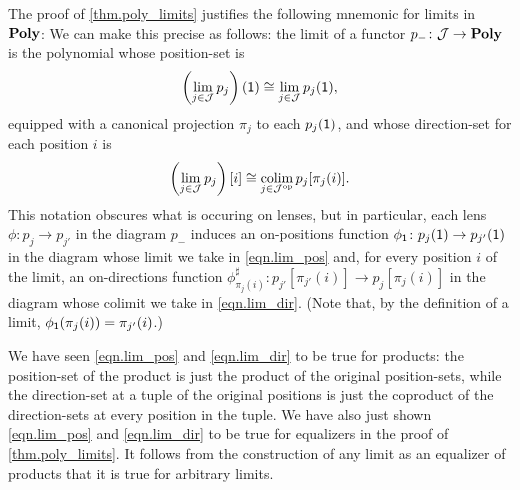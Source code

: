 \documentclass[Book-Poly]{subfiles}
\begin{document}
\begin{example}
The proof of \cref{thm.poly_limits} justifies the following mnemonic for limits in $\mathbf{Poly}$:
We can make this precise as follows: the limit of a functor $p_-\colon\mathcal{J}\to\mathbf{Poly}$ is the polynomial whose position-set is
\begin{equation} \label{eqn.lim_pos}
    \left(\lim_{j\in\mathcal{J}} p_j\right)(\textsf{1}) \cong \lim_{j\in\mathcal{J}} p_j(\textsf{1}),
\end{equation}
equipped with a canonical projection $\pi_j$ to each $p_j(\textsf{1})$, and whose direction-set for each position $i$ is
\begin{equation} \label{eqn.lim_dir}
    \left(\lim_{j\in\mathcal{J}} p_j\right)[i] \cong \operatorname*{colim}_{j\in\mathcal{J}^{\textnormal{op}}} p_j[\pi_j(i)].
\end{equation}
This notation obscures what is occuring on lenses, but in particular, each lens $\phi\colon p_j\to p_{j'}$ in the diagram $p_-$ induces an on-positions function $\phi_{\textsf{1}}\colon p_j(\textsf{1})\to p_{j'}(\textsf{1})$ in the diagram whose limit we take in \eqref{eqn.lim_pos} and, for every position $i$ of the limit, an on-directions function $\phi^\sharp_{\pi_j(i)}\colon p_{j'}[\pi_{j'}(i)]\to p_j[\pi_j(i)]$ in the diagram whose colimit we take in \eqref{eqn.lim_dir}.
(Note that, by the definition of a limit, $\phi_{\textsf{1}}(\pi_j(i)) = \pi_{j'}(i)$.)

We have seen \eqref{eqn.lim_pos} and \eqref{eqn.lim_dir} to be true for products: the position-set of the product is just the product of the original position-sets, while the direction-set at a tuple of the original positions is just the coproduct of the direction-sets at every position in the tuple.
We have also just shown \eqref{eqn.lim_pos} and \eqref{eqn.lim_dir} to be true for equalizers in the proof of \cref{thm.poly_limits}.
It follows from the construction of any limit as an equalizer of products that it is true for arbitrary limits.
\end{example}
\end{document}
